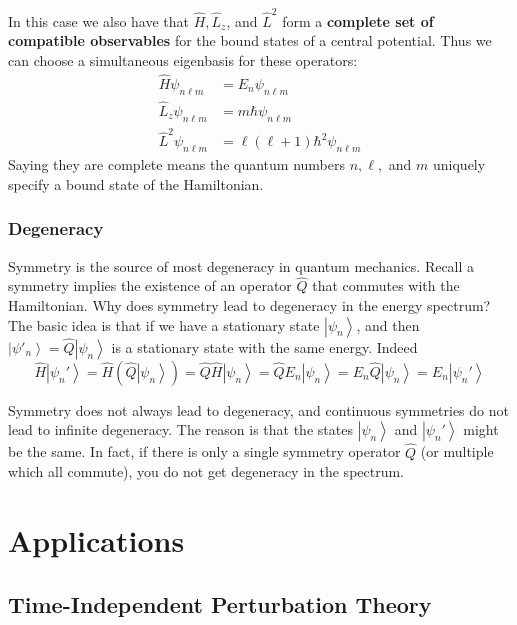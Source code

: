 \documentclass[12pt, a4paper, oneside, openright, titlepage]{book}
\newcommand{\ket}[1]{\left\vert#1\right\rangle}
\begin{document}
In this case we also have that $\hat{H},\hat{L}_z$, and $\hat{L}^2$ form a \textbf{complete set of compatible observables} for the bound states of a central potential. Thus we can choose a simultaneous eigenbasis for these operators: \begin{align*}
    \hat{H}\psi_{n\ell m} &= E_n\psi_{n\ell m} \\
    \hat{L}_z\psi_{n\ell m} &= m\hbar \psi_{n\ell m} \\
    \hat{L}^2\psi_{n\ell m} &= \ell(\ell+1)\hbar^2\psi_{n\ell m}
\end{align*}
Saying they are complete means the quantum numbers $n,\ell,$ and $m$ uniquely specify a bound state of the Hamiltonian.


\section{Degeneracy}

Symmetry is the source of most degeneracy in quantum mechanics. Recall a symmetry implies the existence of an operator $\hat{Q}$ that commutes with the Hamiltonian. Why does symmetry lead to degeneracy in the energy spectrum? The basic idea is that if we have a stationary state $\ket{\psi_n}$, and then $\ket{\psi'_n} = \hat{Q}\ket{\psi_n}$ is a stationary state with the same energy. Indeed \begin{equation*}
    \hat{H}\ket{\psi_n'} = \hat{H}\left(\hat{Q}\ket{\psi_n}\right) = \hat{Q}\hat{H}\ket{\psi_n} = \hat{Q} E_n\ket{\psi_n} = E_n\hat{Q}\ket{\psi_n} = E_n\ket{\psi_n'}
\end{equation*}

Symmetry does not always lead to degeneracy, and continuous symmetries do not lead to infinite degeneracy. The reason is that the states $\ket{\psi_n}$ and $\ket{\psi_n'}$ might be the same. In fact, if there is only a single symmetry operator $\hat{Q}$ (or multiple which all commute), you do not get degeneracy in the spectrum. 


\part{Applications}

\chapter{Time-Independent Perturbation Theory}
\end{document}
